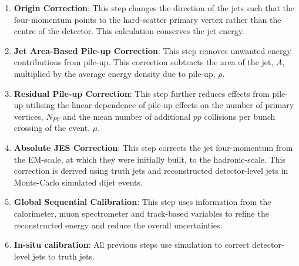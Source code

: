 \vspace{-0.5em}
\begin{enumerate}[leftmargin=*]
\item\textbf{Origin Correction}:
  This step changes the direction of the jets such that the four-momentum points to the hard-scatter primary vertex
  rather than the centre of the detector.
  This calculation conserves the jet energy.\vspace{0.3em}
\item\textbf{Jet Area-Based Pile-up Correction}:
  This step removes unwanted energy contributions from pile-up.
  This correction subtracts the area of the jet, $A$, multiplied by the average energy density due to pile-up, $\rho$.\vspace{0.3em}
\item\textbf{Residual Pile-up Correction}:
  This step further reduces effects from pile-up utilising the linear dependence of pile-up effects on
  the number of primary vertices, $N_{PV}$
  and the mean number of additional $pp$ collisions per bunch crossing of the event, $\mu$.\vspace{0.3em}
\item\textbf{Absolute JES Correction}:
  This step corrects the jet four-momentum from the EM-scale, at which they were initially built,  to the hadronic-scale.
  This correction is derived using truth jets and reconstructed detector-level jets in Monte-Carlo simulated dijet events.\vspace{0.3em}
\item\textbf{Global Sequential Calibration}:
  This step uses information from the calorimeter, muon spectrometer and track-based variables
  to refine the reconstructed energy and reduce the overall uncertainties.\vspace{0.3em}
\item\textbf{In-situ calibration}:
  All previous steps use simulation to correct detector-level jets to truth jets.

\end{enumerate}
